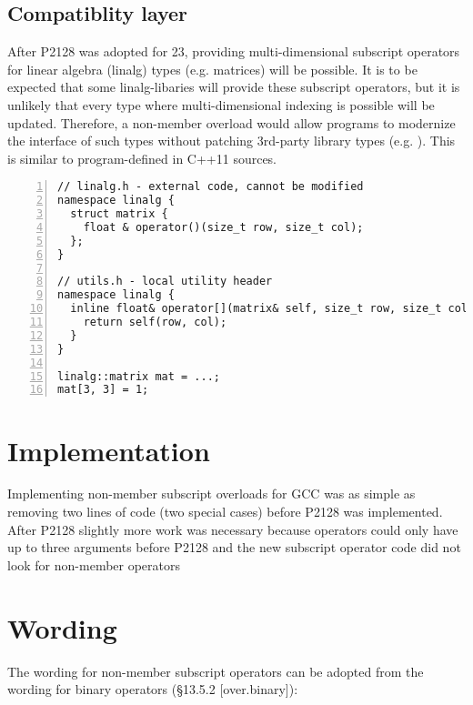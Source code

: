 \subsection{Compatiblity layer}
After P2128 was adopted for \CC{}23, providing multi\hyp dimensional subscript operators for linear algebra (linalg) types (e.g. matrices) will be possible.
It is to be expected that some linalg\hyp libaries will provide these subscript operators, but it is unlikely that every type where multi-dimensional indexing is possible will be updated.
Therefore, a non-member  overload would allow programs to modernize the interface of such types without patching 3rd-party library types (e.g. ).
This is similar to program-defined  in C++11 sources.

\begin{lstlisting}[numbers=left,float={hbtp},label=lst:linalg,caption={
  Extending a type with missing multi-dimensional subscript operator
}]
// linalg.h - external code, cannot be modified
namespace linalg {
  struct matrix {
    float & operator()(size_t row, size_t col);
  };
}

// utils.h - local utility header
namespace linalg {
  inline float& operator[](matrix& self, size_t row, size_t col) {
    return self(row, col);
  }
}

linalg::matrix mat = ...;
mat[3, 3] = 1;
\end{lstlisting}

\section{Implementation}
Implementing non-member subscript overloads for GCC was as simple as removing two lines of code (two special cases) before P2128 was implemented.
After P2128 slightly more work was necessary because operators could only have up to three arguments before P2128 and the new subscript operator code did not look for non-member operators

\section{Wording}

The wording for non\hyp member subscript operators can be adopted from the wording for binary operators (§13.5.2 [over.binary]):

